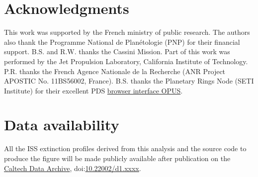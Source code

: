 \section*{Acknowledgments}

This work was supported by the French ministry of public research. The authors also thank the Programme National de Plan\'{e}tologie (PNP) for their financial support.
B.S. and R.W. thanks the Cassini Mission. Part of this work was performed by the Jet Propulsion Laboratory, California Institute of Technology.
P.R. thanks the French Agence Nationale de la Recherche (ANR Project APOSTIC No. 11BS56002, France).
B.S. thanks the Planetary Rings Node (SETI Institute) for their excellent PDS \href{https://tools.pds-rings.seti.org/opus}{browser interface OPUS}.

\section*{Data availability}
All the ISS extinction profiles derived from this analysis and the source code to produce the figure will be made
publicly available after publication on the \href{https://data.caltech.edu}{Caltech Data Archive},
doi:\href{https://doi.org/10.22002/d1.xxxx}{10.22002/d1.xxxx}.